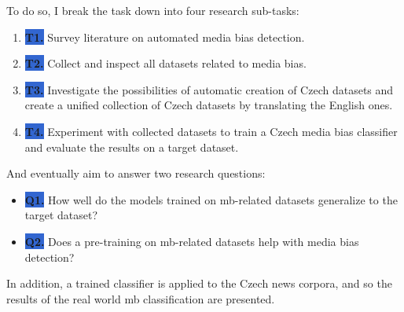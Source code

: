  To do so, I break the task down into four research sub-tasks:
 \begin{enumerate}
     \item[] \colorbox{highlight}{\textbf{T1.}\label{T1}} Survey literature on automated media bias detection.
     \item[] \colorbox{highlight}{\textbf{T2.}\label{T2}} Collect and inspect all datasets related to media bias.
     \item[] \colorbox{highlight}{\textbf{T3.}\label{T3}} Investigate the possibilities of automatic creation of Czech datasets and create a unified collection of Czech datasets by translating the English ones.
     \item[] \colorbox{highlight}{\textbf{T4.}\label{T4}} Experiment with collected datasets to train a Czech media bias classifier and evaluate the results on a target dataset.
 \end{enumerate}
 
\noindent And eventually aim to answer two research questions:
\begin{itemize}
    \item[] \colorbox{highlight}{\textbf{Q1.}\label{Q1}} How well do the models trained on \gls{mb}-related datasets generalize to the target dataset?
    \item[] \colorbox{highlight}{\textbf{Q2.}\label{Q2}} Does a pre-training on \gls{mb}-related datasets help with media bias detection?
\end{itemize}

In addition, a trained classifier is applied to the Czech news corpora, and so the results of the real world \gls{mb} classification are presented.


\let\cleardoublepage\clearpage